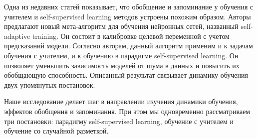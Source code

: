 Одна из недавних статей \cite{selfadaptive} показывает, что обобщение и запоминание у обучения с учителем и self-supervised learning методов устроены похожим образом. Авторы предлагают новый мета-алгоритм для обучения нейронных сетей, названный self-adaptive training. Он состоит в калибровке целевой переменной с учетом предсказаний модели. Согласно авторам, данный алгоритм применим и к задачам обучения с учителем, и к обучению в парадигме self-supervised learning. Он позволяет уменьшить зависимость моделей от шума в данных и повысить их обобщающую способность. Описанный результат связывает динамику обучения двух упомянутых постановок.

Наше исследование делает шаг в направлении изучения динамики обучения, эффектов обобщения и запоминания. При этом мы одновременно рассматриваем три постановки: парадигму self-supervised learning, обучение с учителем и обучение со случайной разметкой.
